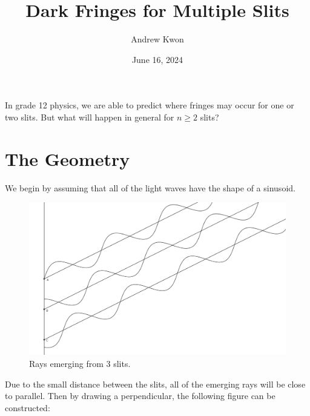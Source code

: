 \documentclass[12pt]{article}
\title{Dark Fringes for Multiple Slits}
\author{Andrew Kwon}
\date{June 16, 2024}
\begin{document}
\maketitle
In grade 12 physics, we are able to predict where fringes may occur for one or two slits. 
But what will happen in general for $n \geq 2$ slits? 
\section{The Geometry}
We begin by assuming that all of the light waves have the shape of a sinusoid.
\begin{figure}[h!]
    \includegraphics[width=\linewidth]{fig_uno.png}
    \caption{Rays emerging from 3 slits.}
    \label{fig:rays}
  \end{figure}
\newpage
Due to the small distance between the slits, all of the emerging rays will be close to parallel. Then by drawing a perpendicular, the following figure can be constructed:
\end{document}
